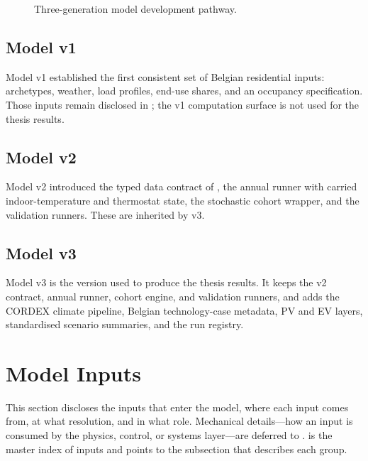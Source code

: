 \begin{figure}[ht]
{}
  \caption{Three-generation model development pathway.}
  \label{fig:model_hierarchy}
\end{figure}


\subsection{Model v1}
\label{sec:modelv1}

Model v1 established the first consistent set of Belgian residential inputs: archetypes, weather, load profiles, end-use shares, and an occupancy specification. Those inputs remain disclosed in ; the v1 computation surface is not used for the thesis results.


\subsection{Model v2}
\label{sec:modelv2}

Model v2 introduced the typed data contract of , the annual runner with carried indoor-temperature and thermostat state, the stochastic cohort wrapper, and the validation runners. These are inherited by v3.


\subsection{Model v3}
\label{sec:modelv3}

Model v3 is the version used to produce the thesis results. It keeps the v2 contract, annual runner, cohort engine, and validation runners, and adds the CORDEX climate pipeline, Belgian technology-case metadata, PV and EV layers, standardised scenario summaries, and the run registry.


\pagebreak
\section{Model Inputs}
\label{sec:model_inputs}
This section discloses the inputs that enter the model, where each input comes from, at what resolution, and in what role. Mechanical details---how an input is consumed by the physics, control, or systems layer---are deferred to .  is the master index of inputs and points to the subsection that describes each group.

